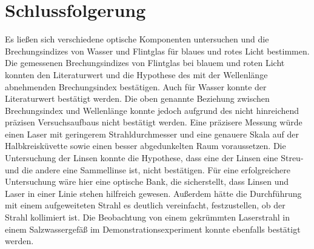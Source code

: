 \documentclass[
	a4paper,
	12pt,
	pagesize,
	ngerman
]{scrartcl}
\begin{document}
	\section{Schlussfolgerung}
	Es ließen sich verschiedene optische Komponenten untersuchen und die Brechungsindizes von Wasser und Flintglas für blaues und rotes Licht bestimmen.
	Die gemessenen Brechungsindizes von Flintglas bei blauem und roten Licht konnten den Literaturwert und die Hypothese des mit der Wellenlänge abnehmenden Brechungsindex bestätigen.
	Auch für Wasser konnte der Literaturwert bestätigt werden.
	Die oben genannte Beziehung zwischen Brechungsindex und Wellenlänge konnte jedoch aufgrund des nicht hinreichend präzisen Versuchsaufbaus nicht bestätigt werden.
	Eine präzisere Messung würde einen Laser mit geringerem Strahldurchmesser und eine genauere Skala auf der Halbkreisküvette sowie einen besser abgedunkelten Raum voraussetzen. %
	Die Untersuchung der Linsen konnte die Hypothese, dass eine der Linsen eine Streu- und die andere eine Sammellinse ist, nicht bestätigen.
	Für eine erfolgreichere Untersuchung wäre hier eine optische Bank, die sicherstellt, dass Linsen und Laser in einer Linie stehen hilfreich gewesen.
	Außerdem hätte die Durchführung mit einem aufgeweiteten Strahl es deutlich vereinfacht, festzustellen, ob der Strahl kollimiert ist.
	Die Beobachtung von einem gekrümmten Laserstrahl in einem Salzwassergefäß im Demonstrationsexperiment konnte ebenfalls bestätigt werden.
	\printbibliography
\end{document}
